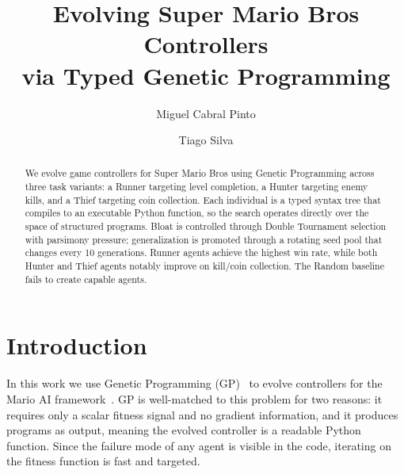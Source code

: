 \documentclass[runningheads]{llncs}
\begin{document}
\title{Evolving Super Mario Bros Controllers\\via Typed Genetic Programming}

\author{Miguel Cabral Pinto \and Tiago Silva}

\maketitle

\begin{abstract}
We evolve game controllers for Super Mario Bros using Genetic Programming across three task variants: a Runner targeting level completion, a Hunter targeting enemy kills, and a Thief targeting coin collection. Each individual is a typed syntax tree that compiles to an executable Python function, so the search operates directly over the space of structured programs. Bloat is controlled through Double Tournament selection with parsimony pressure; generalization is promoted through a rotating seed pool that changes every 10 generations. Runner agents achieve the highest win rate, while both Hunter and Thief agents notably improve on kill/coin collection. The Random baseline fails to create capable agents.
\end{abstract}


\section{Introduction}


In this work we use Genetic Programming (GP)~\cite{koza1992genetic} to evolve controllers for the Mario AI framework~\cite{togelius2009mario}. GP is well-matched to this problem for two reasons: it requires only a scalar fitness signal and no gradient information, and it produces programs as output, meaning the evolved controller is a readable Python function. Since the failure mode of any agent is visible in the code, iterating on the fitness function is fast and targeted.
\end{document}
